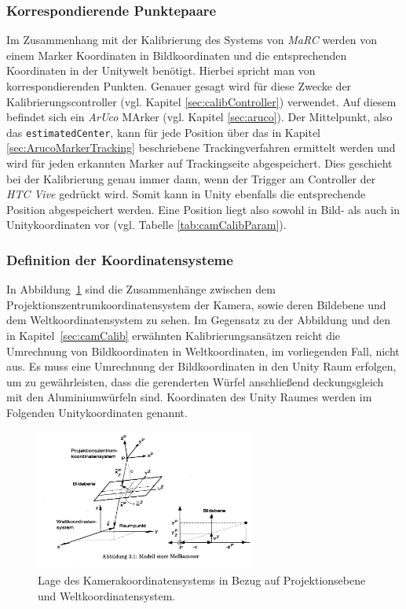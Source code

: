 \subsubsection{Korrespondierende Punktepaare} \label{sec:Korrespondenz} 
Im Zusammenhang mit der Kalibrierung des Systems von \textit{MaRC} werden von einem Marker Koordinaten in Bildkoordinaten und die entsprechenden Koordinaten in der Unitywelt benötigt. Hierbei spricht man von korrespondierenden Punkten. Genauer gesagt wird für diese Zwecke der Kalibrierungscontroller (vgl. Kapitel \ref{sec:calibController}) verwendet. Auf diesem befindet sich ein \textit{ArUco} MArker (vgl. Kapitel \ref{sec:aruco}). Der Mittelpunkt, also das \texttt{estimatedCenter}, kann für jede Position über das in Kapitel \ref{sec:ArucoMarkerTracking} beschriebene Trackingverfahren ermittelt werden und wird für jeden erkannten Marker auf Trackingseite abgespeichert. Dies geschieht bei der Kalibrierung genau immer dann, wenn der Trigger am Controller der \textit{HTC Vive} gedrückt wird. Somit kann in Unity ebenfalls die entsprechende Position abgespeichert werden. Eine Position liegt also sowohl in Bild- als auch in Unitykoordinaten vor (vgl. Tabelle \ref{tab:camCalibParam}). 

\subsubsection{Definition der Koordinatensysteme} \label{sec:DefKoords} 
In Abbildung~\ref{fig:cameraCalib} sind die Zusammenhänge zwischen dem Projektionszentrumkoordinatensystem der Kamera, sowie deren Bildebene und dem Weltkoordinatensystem zu sehen. Im Gegensatz zu der Abbildung und den in Kapitel~\ref{sec:camCalib} erwähnten Kalibrierungsansätzen reicht die Umrechnung von Bildkoordinaten in Weltkoordinaten, im vorliegenden Fall, nicht aus. Es muss eine Umrechnung der Bildkoordinaten in den Unity Raum erfolgen, um zu gewährleisten, dass die gerenderten Würfel anschließend deckungsgleich mit den Aluminiumwürfeln sind. Koordinaten des Unity Raumes werden im Folgenden Unitykoordinaten genannt.\\

\begin{figure}[H]
		\centering
		\includegraphics[width=0.65\textwidth , trim = 0mm 65mm 270mm 0mm, clip]{Bilder/cameraCalib.jpg}
			\caption{Lage des Kamerakoordinatensystems in Bezug auf Projektionsebene und Weltkoordinatensystem. \cite{Meisel:77890}}
			\label{fig:cameraCalib}
	\end{figure}

